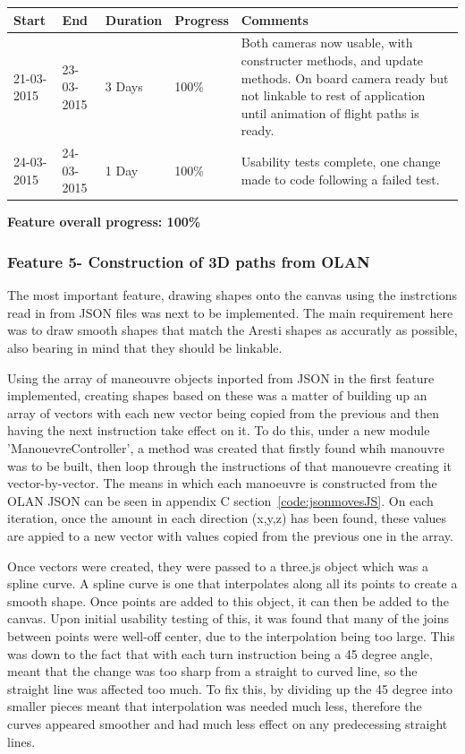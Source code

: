 \begin{table}[h]
\begin{tabular}{|l|l|l|l|p{7cm}|}
\hline
\textbf{Start} & \textbf{End} & \textbf{Duration} & \textbf{Progress} & \textbf{Comments}                                                                                                     \\ \hline
21-03-2015     & 23-03-2015   & 3 Days            & 100\%             &  Both cameras now usable, with constructer methods, and update methods. On board camera ready but not linkable to rest of application until animation of flight paths is ready.\\ \hline
24-03-2015     & 24-03-2015   & 1 Day            & 100\%             &  Usability tests complete, one change made to code following a failed test. \\ \hline
\end{tabular}
\end{table}

\textbf{Feature overall progress: 100\%}

\subsubsection{Feature 5- Construction of 3D paths from OLAN}
The most important feature, drawing shapes onto the canvas using the instrctions read in from JSON files was next to be implemented. The main requirement here was to draw smooth shapes that match the Aresti shapes as accuratly as possible, also bearing in mind that they should be linkable.

Using the array of maneouvre objects inported from JSON in the first feature implemented, creating shapes based on these was a matter of building up an array of vectors with each new vector being copied from the previous and then having the next instruction take effect on it. To do this, under a new module 'ManouevreController', a method was created that firstly found whih manouvre was to be built, then loop through the instructions of that manouevre creating it vector-by-vector. The means in which each manoeuvre is constructed from the OLAN JSON can be seen in appendix C section~\ref{code:jsonmovesJS}. On each iteration, once the amount in each direction (x,y,z) has been found, these values are appied to a new vector with values copied from the previous one in the array.

Once vectors were created, they were passed to a three.js object which was a spline curve. A spline curve is one that interpolates along all its points to create a smooth shape. Once points are added to this object, it can then be added to the canvas. Upon initial usability testing of this, it was found that many of the joins between points were well-off center, due to the interpolation being too large. This was down to the fact that with each turn instruction being a 45 degree angle, meant that the change was too sharp from a straight to curved line, so the straight line was affected too much. To fix this, by dividing up the 45 degree into smaller pieces meant that interpolation was needed much less, therefore the curves appeared smoother and had much less effect on any predecessing straight lines.

